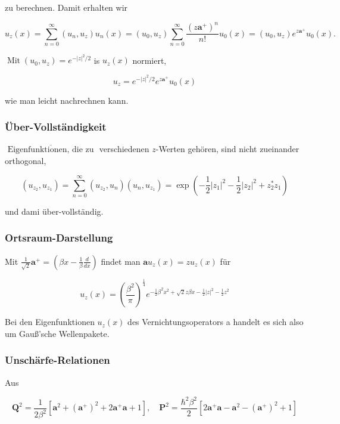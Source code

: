 \documentclass[10pt, letterpaper]{article}
\begin{document}
zu berechnen. Damit erhalten wir

$$
u_{z}(x)=\sum_{n=0}^{\infty}\left(u_{n}, u_{z}\right) u_{n}(x)=\left(u_{0}, u_{z}\right) \sum_{n=0}^{\infty} \frac{\left(z \mathbf{a}^{+}\right)^{n}}{n!} u_{0}(x)=\left(u_{0}, u_{z}\right) e^{z \mathbf{a}^{+}} u_{0}(x) .
$$

$\operatorname{Mit}\left(u_{0}, u_{z}\right)=e^{-|z|^{2} / 2}$ is $u_{z}(x)$ normiert,

$$
u_{z}=e^{-|z|^{2} / 2} e^{z \mathbf{a}^{+}} u_{0}(x)
$$

wie man leicht nachrechnen kann.

\subsubsection*{Über-Vollständigkeit}
$\overline{\text { Eigenfunktionen, die zu }}$ verschiedenen $z$-Werten gehören, sind nicht zueinander orthogonal,

$$
\left(u_{z_{2}}, u_{z_{1}}\right)=\sum_{n=0}^{\infty}\left(u_{z_{2}}, u_{n}\right)\left(u_{n}, u_{z_{1}}\right)=\exp \left(-\frac{1}{2}\left|z_{1}\right|^{2}-\frac{1}{2}\left|z_{2}\right|^{2}+z_{2}^{*} z_{1}\right)
$$

und dami über-vollständig.

\subsubsection*{Ortsraum-Darstellung}
Mit $\frac{1}{\sqrt{2}} \mathbf{a}^{+}=\left(\beta x-\frac{1}{\beta} \frac{d}{d x}\right)$ findet man $\mathbf{a} u_{z}(x)=z u_{z}(x)$ für

$$
u_{z}(x)=\left(\frac{\beta^{2}}{\pi}\right)^{\frac{1}{4}} e^{-\frac{1}{2} \beta^{2} x^{2}+\sqrt{2} z \beta x-\frac{1}{2}|z|^{2}-\frac{1}{2} z^{2}}
$$

Bei den Eigenfunktionen $u_{z}(x)$ des Vernichtungsoperators a handelt es sich also um Gauß'sche Wellenpakete.

\subsubsection*{Unschärfe-Relationen}
Aus

$$
\mathbf{Q}^{2}=\frac{1}{2 \beta^{2}}\left[\mathbf{a}^{2}+\left(\mathbf{a}^{+}\right)^{2}+2 \mathbf{a}^{+} \mathbf{a}+1\right], \quad \mathbf{P}^{2}=\frac{\hbar^{2} \beta^{2}}{2}\left[2 \mathbf{a}^{+} \mathbf{a}-\mathbf{a}^{2}-\left(\mathbf{a}^{+}\right)^{2}+1\right]
$$
\end{document}

